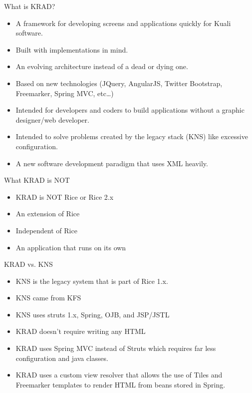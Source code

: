 \documentclass[xcolor=dvipsnames,14pt,professionalfonts]{beamer}
\begin{document}
\begin{frame}{What is KRAD?}
  \begin{itemize}
    \item A framework for developing screens and applications quickly
      for Kuali software.
    \item Built with implementations in mind.
    \item An evolving architecture instead of a dead or dying one.
    \item Based on new technologies (JQuery, AngularJS, Twitter
      Bootstrap, Freemarker, Spring MVC, etc\ldots)
    \item Intended for developers and coders to build applications
      without a graphic designer/web developer.
    \item Intended to solve problems created by the legacy stack (KNS)
      like excessive configuration.
    \item A new software development paradigm that uses XML heavily.
  \end{itemize}
\end{frame}

\begin{frame}{What KRAD is NOT}
  \begin{itemize}
    \item KRAD is NOT Rice or Rice 2.x
    \item An extension of Rice
    \item Independent of Rice
    \item An application that runs on its own
  \end{itemize}
\end{frame}

\begin{frame}{KRAD vs. KNS}
  \begin{itemize}
    \item KNS is the legacy system that is part of Rice 1.x. 
    \item KNS came from KFS
    \item KNS uses struts 1.x, Spring, OJB, and JSP/JSTL
    \item KRAD doesn't require writing any HTML
    \item KRAD uses Spring MVC instead of Struts which requires far
      less configuration and java classes.
    \item KRAD uses a custom view resolver that allows the use of
      Tiles and Freemarker templates to render HTML from beans stored
      in Spring.
  \end{itemize}
\end{frame}
\end{document}
